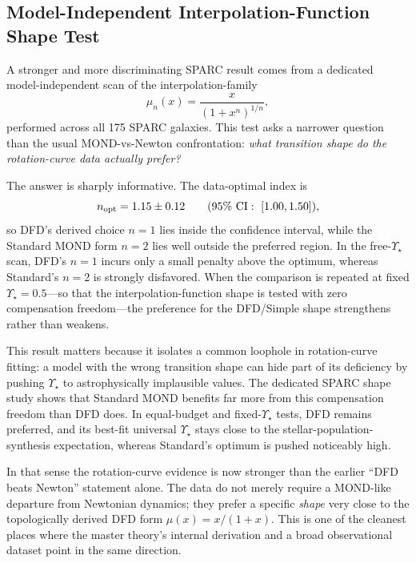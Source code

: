 \subsection{Model-Independent Interpolation-Function Shape Test}\label{sec:galactic-shape-paper}

A stronger and more discriminating SPARC result comes from a dedicated model-independent scan of the interpolation-family
\begin{equation}
\mu_n(x)=\frac{x}{(1+x^n)^{1/n}},
\end{equation}
performed across all 175 SPARC galaxies. This test asks a narrower question than the usual MOND-vs-Newton confrontation: \emph{what transition shape do the rotation-curve data actually prefer?}

The answer is sharply informative. The data-optimal index is
\begin{equation}
 n_{\rm opt}=1.15\pm0.12 \qquad (95\%~\mathrm{CI}:\ [1.00,1.50]),
\end{equation}
so DFD's derived choice $n=1$ lies inside the confidence interval, while the Standard MOND form $n=2$ lies well outside the preferred region. In the free-$\Upsilon_\star$ scan, DFD's $n=1$ incurs only a small penalty above the optimum, whereas Standard's $n=2$ is strongly disfavored. When the comparison is repeated at fixed $\Upsilon_\star=0.5$---so that the interpolation-function shape is tested with zero compensation freedom---the preference for the DFD/Simple shape strengthens rather than weakens.

This result matters because it isolates a common loophole in rotation-curve fitting: a model with the wrong transition shape can hide part of its deficiency by pushing $\Upsilon_\star$ to astrophysically implausible values. The dedicated SPARC shape study shows that Standard MOND benefits far more from this compensation freedom than DFD does. In equal-budget and fixed-$\Upsilon_\star$ tests, DFD remains preferred, and its best-fit universal $\Upsilon_\star$ stays close to the stellar-population-synthesis expectation, whereas Standard's optimum is pushed noticeably high.

In that sense the rotation-curve evidence is now stronger than the earlier ``DFD beats Newton'' statement alone. The data do not merely require a MOND-like departure from Newtonian dynamics; they prefer a specific \emph{shape} very close to the topologically derived DFD form $\mu(x)=x/(1+x)$. This is one of the cleanest places where the master theory's internal derivation and a broad observational dataset point in the same direction.

